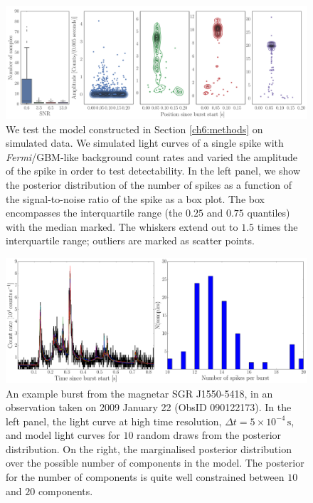 \documentclass[12pt]{emulateapj}
\newcommand{\project}[1]{\textsl{#1}}
\newcommand{\fermi}{\project{Fermi}}
\begin{document}
\begin{figure}[htbp]
\includegraphics[width=\textwidth]{f4a.pdf}%
\caption{We test the model constructed in Section \ref{ch6:methods} on simulated data. We simulated light curves of a single spike with \fermi/GBM-like background count rates and
varied the amplitude of the spike in order to test detectability. In the left panel, we show the posterior distribution of the number of spikes as a function of the signal-to-noise ratio of the spike
 as a box plot. The box encompasses the interquartile range (the $0.25$ and $0.75$ quantiles) with the median marked. The whiskers extend out to $1.5$ times the interquartile range; 
 outliers are marked as scatter points. }
\label{fig:onespike}
\end{figure}

\begin{figure}[htbp]
\includegraphics[width=\textwidth]{f3.pdf}%
\caption{An example burst from the magnetar SGR J1550-5418, in an observation taken on 2009 January 22 (ObsID 090122173). In the left
panel, the light curve at high time resolution, $\Delta t = 5 \times 10^{-4}\,\mathrm{s}$, and model light curves for $10$ random draws from the posterior distribution. 
On the right, the marginalised posterior distribution over the possible number of components in the model. The posterior for the number of components is 
quite well constrained between $10$ and $20$ components.}
\label{fig:dnest_example}
\end{figure}
\end{document}
